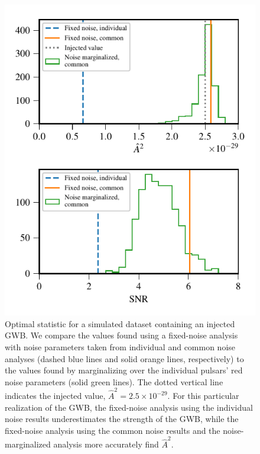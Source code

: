 \documentclass[twocolumn,aps,prd,superscriptaddress]{revtex4-1}
\newcommand{\Agw}{\ensuremath{A_\mathrm{gw}}}
\begin{document}
\begin{figure}[t]
	\includegraphics[width=0.95\columnwidth]{plots/optstat_A5e-15_dataset11.pdf}
	\caption{Optimal statistic for a simulated dataset containing an injected GWB. 
			We compare the values found using a fixed-noise analysis with noise parameters taken from 
			individual and common noise analyses (dashed blue lines and solid orange lines, respectively) 
			to the values found by marginalizing over 
			the individual pulsars' red noise parameters (solid green lines). 
			The dotted vertical line indicates the injected value, $\hat{A}^2 = 2.5 \times 10^{-29}$. 
			For this particular realization of the GWB, the fixed-noise analysis 
			using the individual noise results underestimates the strength of the GWB, 
			while the fixed-noise analysis using the common noise results 
			and the noise-marginalized analysis more accurately find $\hat{A}^2$.}
	\label{fig:os_dataset_sample}
\end{figure}
\end{document}
